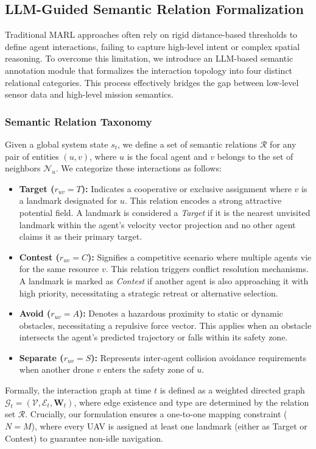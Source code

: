 \documentclass[conference]{IEEEtran}
\begin{document}
\subsection{LLM-Guided Semantic Relation Formalization}

Traditional MARL approaches often rely on rigid distance-based thresholds to define agent interactions, failing to capture high-level intent or complex spatial reasoning. To overcome this limitation, we introduce an LLM-based semantic annotation module that formalizes the interaction topology into four distinct relational categories. This process effectively bridges the gap between low-level sensor data and high-level mission semantics.

\subsubsection{Semantic Relation Taxonomy}
Given a global system state $s_t$, we define a set of semantic relations $\mathcal{R}$ for any pair of entities $(u, v)$, where $u$ is the focal agent and $v$ belongs to the set of neighbors $\mathcal{N}_u$. We categorize these interactions as follows:
\begin{itemize}
    \item \textbf{Target ($r_{uv} = T$):} Indicates a cooperative or exclusive assignment where $v$ is a landmark designated for $u$. This relation encodes a strong attractive potential field. A landmark is considered a \textit{Target} if it is the nearest unvisited landmark within the agent's velocity vector projection and no other agent claims it as their primary target.
    \item \textbf{Contest ($r_{uv} = C$):} Signifies a competitive scenario where multiple agents vie for the same resource $v$. This relation triggers conflict resolution mechanisms. A landmark is marked as \textit{Contest} if another agent is also approaching it with high priority, necessitating a strategic retreat or alternative selection.
    \item \textbf{Avoid ($r_{uv} = A$):} Denotes a hazardous proximity to static or dynamic obstacles, necessitating a repulsive force vector. This applies when an obstacle intersects the agent's predicted trajectory or falls within its safety zone.
    \item \textbf{Separate ($r_{uv} = S$):} Represents inter-agent collision avoidance requirements when another drone $v$ enters the safety zone of $u$.
\end{itemize}
Formally, the interaction graph at time $t$ is defined as a weighted directed graph $\mathcal{G}_t = (\mathcal{V}, \mathcal{E}_t, \mathbf{W}_t)$, where edge existence and type are determined by the relation set $\mathcal{R}$. Crucially, our formulation ensures a one-to-one mapping constraint ($N=M$), where every UAV is assigned at least one landmark (either as Target or Contest) to guarantee non-idle navigation.
\end{document}
